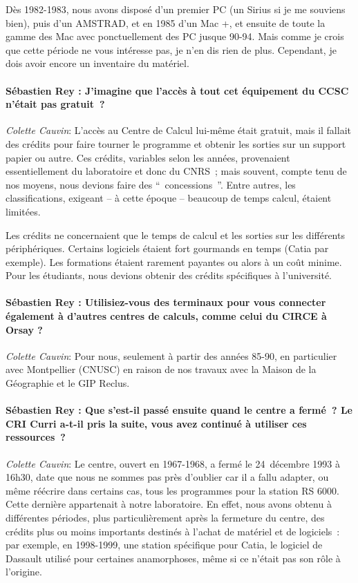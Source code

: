 Dès 1982-1983, nous avons disposé d'un premier PC (un Sirius si je me souviens bien), puis d’un AMSTRAD, et en 1985 d’un Mac +, et ensuite de toute la gamme des Mac avec ponctuellement des PC jusque 90-94. Mais comme je crois que cette période ne vous intéresse pas, je n’en dis rien de plus. Cependant, je dois avoir encore un inventaire du matériel. 

\paragraph*{Sébastien Rey : J'imagine que l'accès à tout cet équipement du CCSC n'était pas gratuit ?}

\noindent\emph{Colette Cauvin}: L’accès au Centre de Calcul lui-même était gratuit, mais il fallait des crédits pour faire tourner le programme et obtenir les sorties sur un support papier ou autre. Ces crédits, variables selon les années, provenaient essentiellement du laboratoire et donc du CNRS ; mais souvent, compte tenu de nos moyens, nous devions faire des \enquote{ concessions }. Entre autres, les classifications, exigeant – à cette époque – beaucoup de temps calcul, étaient limitées. 

Les crédits ne concernaient que le temps de calcul et les sorties sur les différents périphériques. Certains logiciels étaient fort gourmands en temps (Catia par exemple). Les formations étaient rarement payantes ou alors à un coût minime. Pour les étudiants, nous devions obtenir des crédits spécifiques à l’université.

\paragraph*{Sébastien Rey : Utilisiez-vous des terminaux pour vous connecter également à d'autres centres de calculs, comme celui du CIRCE à Orsay ?}

\noindent\emph{Colette Cauvin}: Pour nous, seulement à partir des années 85-90, en particulier avec Montpellier (CNUSC) en raison de nos travaux avec la Maison de la Géographie et le GIP Reclus.

\paragraph*{Sébastien Rey : Que s'est-il passé ensuite quand le centre a fermé ? Le CRI Curri a-t-il pris la suite, vous avez continué à utiliser ces ressources ?}

\noindent\emph{Colette Cauvin}: Le centre, ouvert en 1967-1968, a fermé le 24 décembre 1993 à 16h30, date que nous ne sommes pas près d’oublier car il a fallu adapter, ou même réécrire dans certains cas, tous les programmes pour la station RS 6000. Cette dernière appartenait à notre laboratoire. En effet, nous avons obtenu à différentes périodes, plus particulièrement après la fermeture du centre, des crédits plus ou moins importants destinés à l’achat de matériel et de logiciels : par exemple, en 1998-1999, une station spécifique pour Catia, le logiciel de Dassault utilisé pour certaines anamorphoses, même si ce n’était pas son rôle à l’origine.


